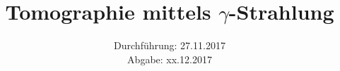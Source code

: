 

\subject{Versuch M14}
\title{Tomographie mittels \texorpdfstring{$\gamma$}{Gamma}-Strahlung}
\date{Durchführung: 27.11.2017 \\
      Abgabe: xx.12.2017}



\maketitle
\newpage






\nocite{VM14}

\printbibliography


